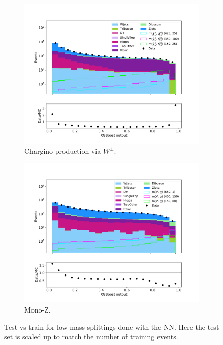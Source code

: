 \begin{figure}[H]
\begin{subfigure}[t!]{0.49\textwidth}
        \label{fig:SlepsnuNNLow}
    \end{subfigure}      
    \begin{subfigure}[t!]{0.49\textwidth}
        \includegraphics[width = \textwidth]{Figures/Stacked/stackedplot_BDT_High_level_WW.pdf}
        \caption{Chargino production via $W^\pm$.}
        \label{fig:WWNNLow}
    \end{subfigure}
    \begin{subfigure}[t!]{0.49\textwidth}
        \includegraphics[width = \textwidth]{Figures/Stacked/stackedplot_BDT_High_level_monoZ.pdf}
        \caption{Mono-Z.}
        \label{fig:MonoZNNLow}
    \end{subfigure}
    \caption{Test vs train for low mass splittings done with the NN. Here the test set is scaled up to match the number of training events.}
    \label{fig:AllLowNN}
\end{figure}








